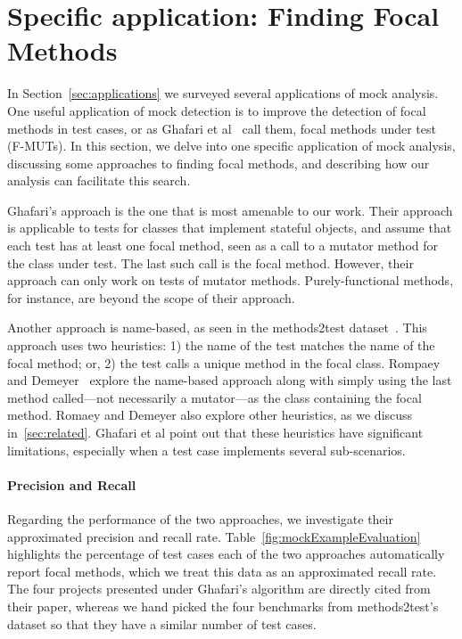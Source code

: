 \section{Specific application: Finding Focal Methods}
\label{sec:focal}

In Section~\ref{sec:applications} we surveyed several applications of mock analysis.
One useful application of mock detection is to
improve the detection of focal methods in test cases, or as Ghafari et
al~\cite{ghafari15:_autom} call them, focal methods under test
(F-MUTs). In this section, we delve into one specific application of mock analysis, 
discussing some approaches to finding
focal methods, and describing how our analysis can facilitate this search.

Ghafari's approach is the one that is most amenable to our work.
Their approach is applicable to tests for classes that implement
stateful objects, and assume that each test has at least one focal
method, seen as a call to a mutator method for the class under test.
The last such call is the focal method. However, their approach can
only work on tests of mutator methods.  Purely-functional methods, for
instance, are beyond the scope of their approach.

Another approach is name-based, as seen in the methods2test
dataset~\cite{tufano2020unit}.  This approach uses two heuristics: 1)
the name of the test matches the name of the focal method; or, 2) the
test calls a unique method in the focal class. Rompaey and
Demeyer~\cite{rompaey09:_estab_traceab_links_unit_test} explore the
name-based approach along with simply using the last method called---not necessarily a mutator---as the class containing the focal method.  Romaey and Demeyer also
explore other heuristics, as we discuss in~\ref{sec:related}. Ghafari et al point out
that these heuristics have significant limitations, especially when a
test case implements several sub-scenarios.


\paragraph{Precision and Recall}

Regarding the performance of the two approaches, we investigate their approximated precision and recall rate. Table~\ref{fig:mockExampleEvaluation} highlights the percentage of test cases each of the two approaches automatically report focal methods, which we treat this data as an approximated recall rate. The four projects presented under Ghafari's algorithm are directly cited from their paper, whereas we hand picked the four benchmarks from methods2test's dataset so that they have a similar number of test cases. 

